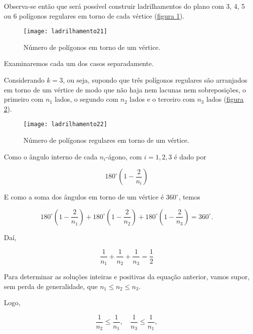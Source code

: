 Observa-se então que será possível construir ladrilhamentos do plano com 3, 4, 5 ou 6 polígonos regulares em torno de cada vértice (\hyperref[lad_tp3]{figura \ref{lad_tp3}}).

\begin{figure}[H]
\centering
\texttt{[image: ladrilhamento21]}
\caption{Número de polígonos em torno de um vértice.}
\label{lad_tp3}
\end{figure}

Examinaremos cada um dos casos separadamente.

Considerando $k=3$, ou seja, supondo que três polígonos regulares são arranjados em torno de um vértice de modo que não haja nem lacunas nem sobreposições, o primeiro com $n_1$ lados, o segundo com $n_2$ lados e o terceiro com $n_3$ lados (\hyperref[lad_tp4]{figura \ref{lad_tp4}}).

\begin{figure}[H]
\centering
\texttt{[image: ladrilhamento22]}
\caption{Número de polígonos regulares em torno de um vértice.}
\label{lad_tp4}
\end{figure}

Como o ângulo interno de cada $n_i$-ágono, com $i=1,2,3$ é dado por

\begin{equation*}
180^{\circ}\left(1-\frac{2}{n_i}\right)
\end{equation*}

E como a soma dos ângulos em torno de um vértice é $360^{\circ}$, temos

\begin{equation*}
180^{\circ}\left(1-\frac{2}{n_1}\right)+180^{\circ}\left(1-\frac{2}{n_2}\right)+180^{\circ}\left(1-\frac{2}{n_3}\right)=360^{\circ}.
\end{equation*}

Daí,

\begin{equation*}
\frac{1}{n_1}+\frac{1}{n_2}+\frac{1}{n_3}=\frac{1}{2}
\end{equation*}

Para determinar as soluções inteiras e positivas da equação anterior, vamos supor, sem perda de generalidade, que $n_1\leq n_2\leq n_3$.

Logo,

\begin{equation*}
\frac{1}{n_2}\leq\frac{1}{n_1},\quad \frac{1}{n_3}\leq\frac{1}{n_1},
\end{equation*}


